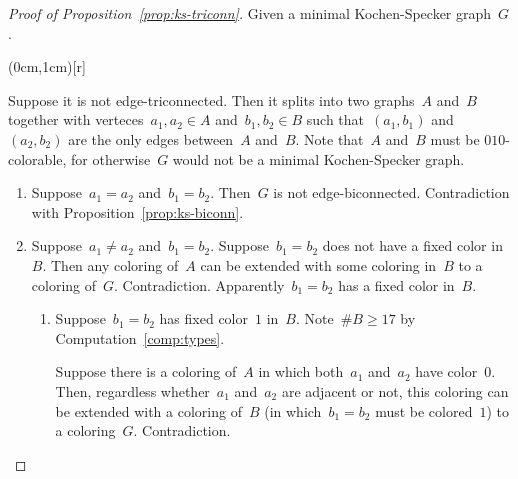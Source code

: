 \documentclass[adraft,copyright,creativecommons]{eptcs}
\theoremstyle{definition}
\theoremstyle{remark}
\begin{document}
\begin{proof}[Proof of Proposition~\ref{prop:ks-triconn}]


    Given a minimal Kochen-Specker graph~$G$.

\parpic(0cm,1cm)[r]{%
}

    Suppose it is not edge-triconnected.
    Then it splits into two graphs~$A$ and~$B$
    together with verteces~$a_1, a_2 \in A$
    and~$b_1,b_2 \in B$
    such that~$(a_1, b_1)$ and~$(a_2,b_2)$
    are the only edges between~$A$ and~$B$.
    Note that~$A$ and~$B$ must be $010$-colorable,
    for otherwise~$G$ would not be a minimal Kochen-Specker graph.

    \begin{enumerate}
    \item Suppose~$a_1 = a_2$ and~$b_1 = b_2$.
                Then~$G$ is not edge-biconnected.  Contradiction with
                    Proposition~\ref{prop:ks-biconn}.
    \item Suppose~$a_1 \neq a_2$ and~$b_1 = b_2$.
        \label{tricase1}
        Suppose~$b_1=b_2$ does not have a fixed color in~$B$.
        Then any coloring of~$A$ can be extended with some coloring
        in~$B$ to a coloring of~$G$.  Contradiction.
        Apparently~$b_1=b_2$ has a fixed color in~$B$.
        \begin{enumerate}
            \item
            Suppose~$b_1=b_2$ has fixed color~$1$ in~$B$.
            Note~$\#B \geq 17$ by Computation~\ref{comp:types}.

            Suppose there is a coloring of~$A$
            in which both~$a_1$ and~$a_2$ have color~$0$.
            Then, regardless whether~$a_1$ and~$a_2$ are adjacent or not,
            this coloring can be extended with a coloring of~$B$
            (in which~$b_1=b_2$ must be colored~$1$)
            to a coloring~$G$.  Contradiction.


\end{enumerate}
\end{enumerate}
\end{proof}
\end{document}
